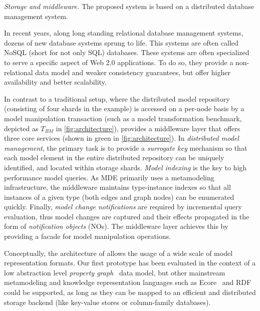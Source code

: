 \emph{Storage and middleware.}\label{storage_and_middleware}
The proposed system is based on a distributed database management system.

In recent years, along long standing relational database management systems, dozens of new database systems sprung to life. This systems are often called NoSQL (short for not only SQL) databases.
These systems are often specialized to serve a specific aspect of Web 2.0 applications. To do so, they provide a non-relational data model and weaker consistency guarantees, but offer higher availability and better scalability.

In contrast to a traditional setup, where the distributed model repository (consisting of four shards in the example) is accessed on a per-node basis by a model manipulation transaction (such as a model transformation benchmark, depicted as $T_{BM}$ in \autoref{fig:architecture}), \iqd{} provides a middleware layer that offers three core services (shown in green in \autoref{fig:architecture}).
In {{\em distributed model management}}, the primary task is to provide a \emph{surrogate key} mechanism so that each model element in the entire distributed repository can be uniquely identified, and located within storage shards.
{{\em Model indexing}} is the key to high performance model queries. As MDE primarily uses a metamodeling infrastructure, the \iqd{} middleware maintains type-instance indexes so that all instances of a given type (both edges and graph nodes) can be enumerated quickly.
Finally, {{\em model change notifications}} are required by incremental query evaluation, thus model changes are captured and their effects propagated in the form of \emph{notification objects} (NOs). The middleware layer achieves this by providing a facade for model manipulation operations. 

Conceptually, the architecture of \iqd{} allows the usage of a wide scale of model representation formats. Our first prototype has been evaluated in the context of a low abstraction level \emph{property graph}~\cite{DBLP:journals/corr/abs-1006-2361} data model, but other mainstream metamodeling and knowledge representation languages such as Ecore~\cite{EMF} and RDF~\cite{website:rdf_standard} could be supported, as long as they can be mapped to an efficient and distributed storage backend (like key-value stores or column-family databases).


